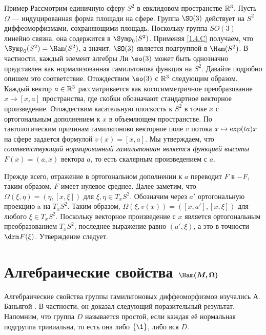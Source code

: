 \begin{thm}{Пример}\label{1.4.H}
Рассмотрим единичную сферу $S^2$ в евклидовом пространстве $\mathbb{R}^3$.
Пусть $\Omega$ --- индуцированная форма площади на сфере.
Группа $\SO(3)$ действует на $S^2$ диффеоморфизмами, сохраняющими площадь.
Поскольку группа $SO(3)$ линейно связна, она содержится в $\Symp_0 (S^2)$.
Применяя \ref{1.4.C} получаем, что $\Symp_0 (S^2) \z= \Ham (S^2)$, а значит, $\SO (3)$ является подгруппой в $\Ham (S^2)$.
В частности, каждый элемент алгебры Ли $\so(3)$ может быть однозначно представлен как нормализованная гамильтонова функция на $S^2$.
Давайте подробно опишем это соответствие.
Отождествим $\so (3)$ с $\mathbb{R}^3$ следующим образом.
Каждый вектор $a \in \mathbb{R}^3$ рассматривается как кососимметричное преобразование $x \to [x, a]$ пространства, где скобки обозначают стандартное векторное произведение.
Отождествим касательную плоскость к $S^2$ в точке $x$ с ортогональным
дополнением к $x$ в объемлющем пространстве.
По тавтологическим причинам гамильтоново векторное поле $v$ потока $x \z\mapsto \exp (ta) x$ на сфере задается формулой $v (x) = [x, a]$.
Мы утверждаем, что \emph{соответствующий нормированный гамильтониан является
функцией высоты $F(x)=(a,x)$}  вектора $a$, то есть скалярным произведением с $a$.

Прежде всего, отражение в ортогональном дополнении к $a$ переводит $F$ в $-F$, таким образом, $F$ имеет нулевое среднее.
Далее заметим, что $\Omega (\xi, \eta) = (\eta, [x, \xi])$ для $\xi, \eta \in T_x S^2$.
Обозначим через $a'$ ортогональную проекцию a на $T_x S^2$.
Таким образом, $\Omega (\xi, v(x)) = ([x, a'], [x, \xi])$ для любого $\xi \in T_x S^2$.
Поскольку векторное произведение с $x$ является ортогональным преобразованием $T_x S^2$, последнее выражение равно $(a', \xi)$,
а это в точности $\d F(\xi)$.
Утверждение следует.
\end{thm}

\section[Алгебраические свойства $\Ham(M,\Omega)$]%
{Алгебраические свойства $\bm{\Ham(M, \Omega)}$}

Алгебраические свойства группы гамильтоновых диффеоморфизмов изучались А. Баньягой \cite{B1,B2}.
В частности, он доказал следующий поразительный результат.
Напомним, что группа $D$ называется простой, если каждая её нормальная подгруппа тривиальна, то есть она либо $\{\1\}$, либо вся $D$.


